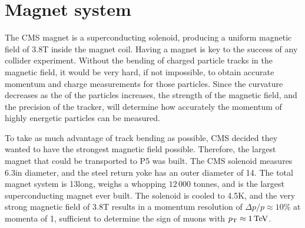 
\section{Magnet system \label{sec:cms_magnet}}

The CMS magnet is a superconducting solenoid, producing a uniform magnetic field of 3.8\unit{T}
inside the magnet coil. 
Having a magnet is key to the success of any collider experiment. Without the bending of charged
particle tracks in the magnetic field, it would be very hard, if not impossible, to obtain
accurate momentum and charge measurements for those particles. 
Since the curvature decreases as the \pt of the particles increases, the strength of the magnetic
field, and the precision of the tracker, will determine how accurately the momentum of highly
energetic particles can be measured. 

To take as much advantage of track bending as possible, CMS decided they wanted to have the
strongest magnetic field possible. Therefore, the largest magnet that could be transported to P5
was built. The CMS solenoid measures 6.3\meter in diameter, and the steel return yoke has an outer
diameter of 14\meter. The total magnet system is 13\meter long, weighs a whopping $12\,000$ tonnes,
and is the largest superconducting magnet ever built. The solenoid is cooled to 4.5\unit{K}, and the
very strong magnetic field of 3.8\unit{T} results in a momentum resolution of $\Delta p / p \approx
10\%$ at momenta of 1\TeV, sufficient to determine the sign of muons with $p_{\mathrm{T}} \approx 1 \,\text{Te\hspace{-.08em}V}$. 

